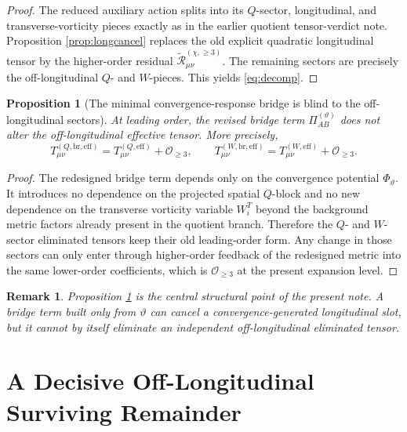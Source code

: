 \documentclass[11pt]{article}
\newcommand{\PiTheta}{\Pi^{(\vartheta)}}
\newcommand{\ReLong}{\widetilde{\mathcal R}_{\mu\nu}^{(\chi,\ge 3)}}
\newtheorem{proposition}{Proposition}
\newtheorem{remark}{Remark}
\begin{document}
\begin{proof}
The reduced auxiliary action splits into its \(Q\)-sector, longitudinal, and transverse-vorticity pieces exactly as in the earlier quotient tensor-verdict note. Proposition \ref{prop:longcancel} replaces the old explicit quadratic longitudinal tensor by the higher-order residual \(\ReLong\). The remaining sectors are precisely the off-longitudinal \(Q\)- and \(W\)-pieces. This yields \eqref{eq:decomp}.
\end{proof}

\begin{proposition}[The minimal convergence-response bridge is blind to the off-longitudinal sectors]
\label{prop:blind}
At leading order, the revised bridge term \(\PiTheta_{AB}\) does not alter the off-longitudinal effective tensor. More precisely,
\begin{equation}
T_{\mu\nu}^{(Q,\mathrm{br,eff})}
=
T_{\mu\nu}^{(Q,\mathrm{eff})}
+\mathcal O_{\ge 3},
\qquad
T_{\mu\nu}^{(W,\mathrm{br,eff})}
=
T_{\mu\nu}^{(W,\mathrm{eff})}
+\mathcal O_{\ge 3}.
\label{eq:blind}
\end{equation}
\end{proposition}

\begin{proof}
The redesigned bridge term depends only on the convergence potential \(\Phi_\vartheta\). It introduces no dependence on the projected spatial \(Q\)-block and no new dependence on the transverse vorticity variable \(W_i^T\) beyond the background metric factors already present in the quotient branch. Therefore the \(Q\)- and \(W\)-sector eliminated tensors keep their old leading-order form. Any change in those sectors can only enter through higher-order feedback of the redesigned metric into the same lower-order coefficients, which is \(\mathcal O_{\ge 3}\) at the present expansion level.
\end{proof}

\begin{remark}
Proposition \ref{prop:blind} is the central structural point of the present note. A bridge term built only from \(\vartheta\) can cancel a convergence-generated longitudinal slot, but it cannot by itself eliminate an independent off-longitudinal eliminated tensor.
\end{remark}

\section{A Decisive Off-Longitudinal Surviving Remainder}
\end{document}
